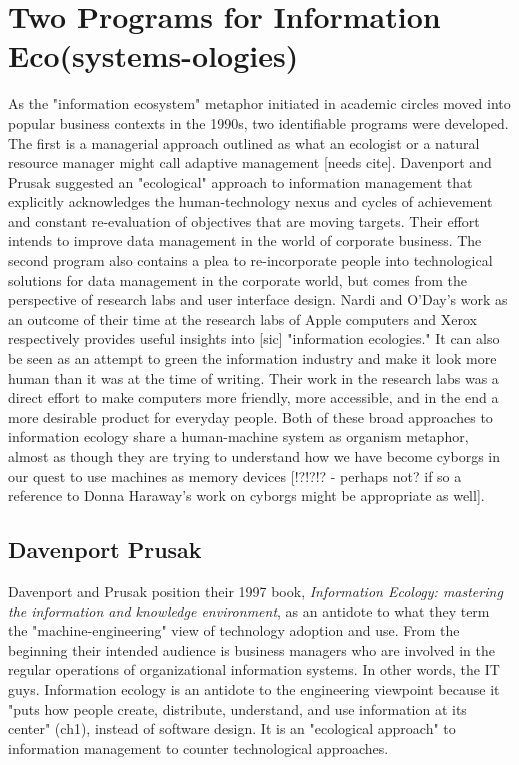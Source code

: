 \section{Two Programs for Information Eco(systems-ologies)}

As the "information ecosystem" metaphor initiated in academic circles moved into popular business contexts in the 1990s, two identifiable programs were developed. The first is a managerial approach outlined as what an ecologist or a natural resource manager might call adaptive management [needs cite]. Davenport and Prusak suggested an "ecological" approach to information management that explicitly acknowledges the human-technology nexus and cycles of achievement and constant re-evaluation of objectives that are moving targets. Their effort intends to improve data management in the world of corporate business. The second program also contains a plea to re-incorporate people into technological solutions for data management in the corporate world, but comes from the perspective of research labs and user interface design. Nardi and O'Day's work as an outcome of their time at the research labs of Apple computers and Xerox respectively provides useful insights into [sic] "information ecologies." It can also be seen as an attempt to green the information industry and make it look more human than it was at the time of writing. Their work in the research labs was a direct effort to make computers more friendly, more accessible, and in the end a more desirable product for everyday people. Both of these broad approaches to information ecology share a human-machine system as organism metaphor, almost as though they are trying to understand how we have become cyborgs in our quest to use machines as memory devices \cite[cf.][]{bowker_2005} [!?!?!? - perhaps not? if so a reference to Donna Haraway's work on cyborgs might be appropriate as well].

\subsection{Davenport Prusak}

Davenport and Prusak position their 1997 book, \textit{Information Ecology: mastering the information and knowledge environment}, as an antidote to what they term the "machine-engineering" view of technology adoption and use. From the beginning their intended audience is business managers who are involved in the regular operations of organizational information systems. In other words, the IT guys. Information ecology is an antidote to the engineering viewpoint because it "puts how people create, distribute, understand, and use information at its center" (ch1), instead of software design. It is an "ecological approach" to information management to counter technological approaches.

